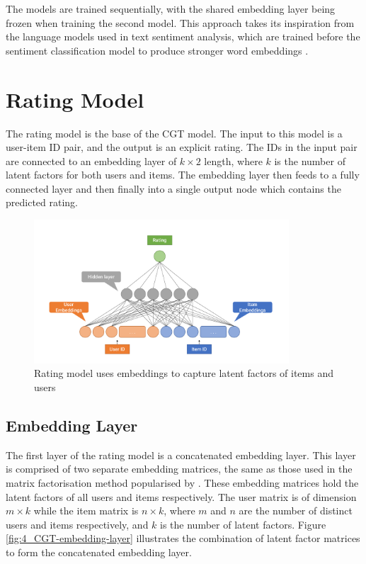 The models are trained sequentially, with the shared embedding layer being frozen when training the second model. This approach takes its inspiration from the language models used in text sentiment analysis, which are trained before the sentiment classification model to produce stronger word embeddings \parencite{howard2018universal}.

\section{Rating Model}
\label{section:rating-model}
The rating model is the base of the CGT model. The input to this model is a user-item ID pair, and the output is an explicit rating. The IDs in the input pair are connected to an embedding layer of $k\times2$ length, where $k$ is the number of latent factors for both users and items. The embedding layer then feeds to a fully connected layer and then finally into a single output node which contains the predicted rating.

\begin{figure}[H]
\centering
\includegraphics[width=0.85\textwidth]{Figures/4_rating-model.pdf}
\decoRule
\caption[Rating model]{Rating model uses embeddings to capture latent factors of items and users}
\label{fig:4_rating-prediction-architecture}
\end{figure}

\subsection{Embedding Layer}
The first layer of the rating model is a concatenated embedding layer. This layer is comprised of two separate embedding matrices, the same as those used in the matrix factorisation method popularised by \cite{koren2009matrix}. These embedding matrices hold the latent factors of all users and items respectively. The user matrix is of dimension $m\times k$ while the item matrix is $n\times k$, where $m$ and $n$ are the number of distinct users and items respectively, and $k$ is the number of latent factors. Figure \ref{fig:4_CGT-embedding-layer} illustrates the combination of latent factor matrices to form the concatenated embedding layer.

